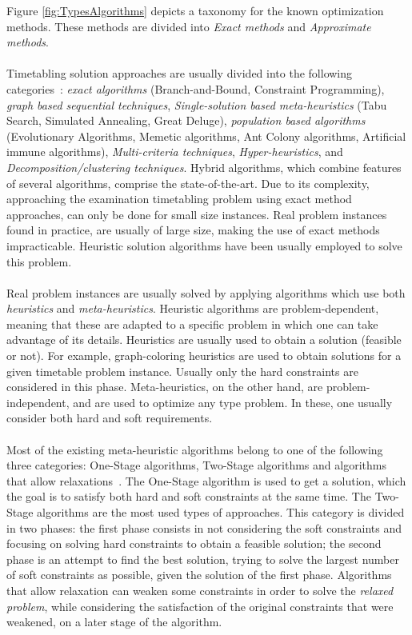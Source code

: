 Figure \ref{fig:TypesAlgorithms} depicts a taxonomy for the known optimization methods. These methods are divided into \textit{Exact methods} and \textit{Approximate methods}.\\
\\
Timetabling solution approaches are usually divided into the following categories~\cite{Qu2009}: \textit{exact algorithms} (Branch-and-Bound, Constraint Programming), \textit{graph based sequential techniques}, \textit{Single-solution based meta-heuristics} (Tabu Search, Simulated Annealing, Great Deluge), \textit{population based algorithms} (Evolutionary Algorithms, Memetic algorithms, Ant Colony algorithms, Artificial immune algorithms), \textit{Multi-criteria techniques}, \textit{Hyper-heuristics}, and \textit{Decomposition/clustering techniques}. Hybrid algorithms, which combine features of several algorithms, comprise the state-of-the-art. Due to its complexity, approaching the examination timetabling problem using exact method approaches, can only be done for small size instances. Real problem instances found in practice, are usually of large size, making the use of exact methods impracticable. Heuristic solution algorithms have been usually employed to solve this problem.\\
\\
Real problem instances are usually solved by applying algorithms which use both \textit{heuristics} and \textit{meta-heuristics}. Heuristic algorithms are problem-dependent, meaning that these are adapted to a specific problem in which one can take advantage of its details. Heuristics are usually used to obtain a solution (feasible or not). For example, graph-coloring heuristics are used to obtain solutions for a given timetable problem instance. Usually only the hard constraints are considered in this phase. Meta-heuristics, on the other hand, are problem-independent, and are used to optimize any type problem. In these, one usually consider both hard and soft requirements.\\
\\
Most of the existing meta-heuristic algorithms belong to one of the following three categories: One-Stage algorithms, Two-Stage algorithms and algorithms that allow relaxations~\cite{Lewis2007}. The One-Stage algorithm is used to get a solution, which the goal is to satisfy both hard and soft constraints at the same time. The Two-Stage algorithms are the most used types of approaches. This category is divided in two phases: the first phase consists in not considering the soft constraints and focusing on solving hard constraints to obtain a feasible solution; the second phase is an attempt to find the best solution, trying to solve the largest number of soft constraints as possible, given the solution of the first phase. Algorithms that allow relaxation can weaken some constraints in order to solve the \textit{relaxed problem}, while considering the satisfaction of the original constraints that were weakened, on a later stage of the algorithm.


